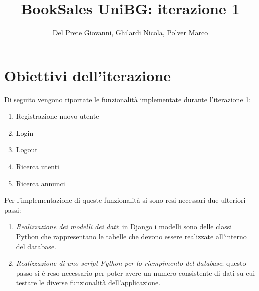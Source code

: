 \documentclass[10pt,a4paper]{report}
\author{Del Prete Giovanni, Ghilardi Nicola, Polver Marco}
\title{BookSales UniBG: iterazione 1}
\begin{document}
	
	\maketitle
	\tableofcontents
	
	\section{Obiettivi dell'iterazione}
	Di seguito vengono riportate le funzionalità implementate durante l'iterazione 1:
	\begin{enumerate}
		\item Registrazione nuovo utente
		\item Login
		\item Logout
		\item Ricerca utenti
		\item Ricerca annunci
	\end{enumerate}
	Per l'implementazione di queste funzionalità si sono resi necessari due ulteriori passi:
	\begin{enumerate}
		\item \textit{Realizzazione dei modelli dei dati}: in Django i modelli sono delle classi Python che rappresentano le tabelle che devono essere realizzate all'interno del database.
		\item \textit{Realizzazione di uno script Python per lo riempimento del database}: questo passo si è reso necessario per poter avere un numero consistente di dati su cui testare le diverse funzionalità dell'applicazione.
	\end{enumerate}
\end{document}

